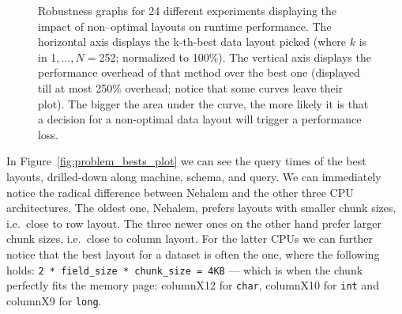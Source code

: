 \documentclass{sig-alternate}
\begin{document}
\begin{figure}[!ht]
\centering
{}
\caption{Robustness graphs for 24 different experiments displaying the impact of non--optimal layouts on runtime performance. The horizontal axis displays the k-th-best data layout picked (where $k$ is in 1$,\ldots, N=$252; normalized to 100\%). The vertical axis displays the performance overhead of that method over the best one (displayed till at most 250\% overhead; notice that some curves leave their plot).
The bigger the area under the curve, the more likely it is that a decision for a non-optimal data layout will trigger a performance loss. }  
\label{fig:fragility}
\vspace{-10pt}
\end{figure}

In Figure~\ref{fig:problem_bests_plot} we can see the query times of the best layouts, drilled-down along machine, schema, and query. We can immediately notice the radical difference between Nehalem and the other three CPU architectures. The oldest one, Nehalem, prefers layouts with smaller chunk sizes, i.e.~close to row layout. The three newer ones on the other hand prefer larger chunk sizes, i.e.~close to column layout. For the latter CPUs we can further notice that the best layout for a dataset is often the one, where the following holds: \texttt{2~* field\_size * chunk\_size = 4KB} --- which is when the chunk perfectly fits the memory page: columnX12 for \texttt{char}, columnX10 for \texttt{int} and columnX9 for \texttt{long}.
\end{document}
